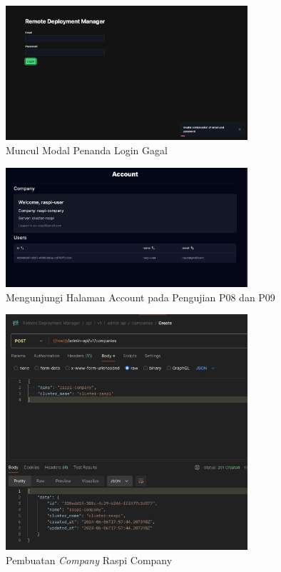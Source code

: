 \begin{figure}[ht]
  \centering
  \includegraphics[width=0.8\textwidth]{resources/chapter-4/pengujian/p08.jpg}
  \caption{Muncul Modal Penanda Login Gagal}
  \label{fig:pengujian-p08}
\end{figure}


\begin{figure}[ht]
  \centering
  \includegraphics[width=0.8\textwidth]{resources/chapter-4/pengujian/p08-09.jpg}
  \caption{Mengunjungi Halaman Account pada Pengujian P08 dan P09}
  \label{fig:pengujian-p08-09}
\end{figure}

\begin{figure}[ht]
  \centering
  \includegraphics[width=0.8\textwidth]{resources/chapter-4/pengujian/pengujian-sistem-raspi-01.jpg}
  \caption{Pembuatan \textit{Company} Raspi Company}
  \label{fig:pengujian-sistem-raspi-01}
\end{figure}

